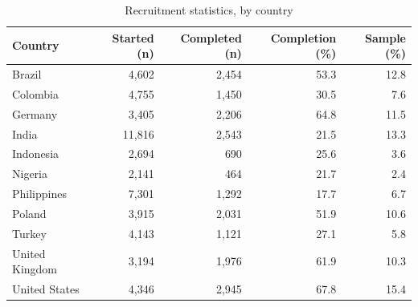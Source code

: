 \begin{table}

\caption{\label{tab:survey-attrition}Recruitment statistics, by country}
\centering
\begin{tabular}[t]{lrrrr}
\toprule
\textbf{Country} & \textbf{Started (n)} & \textbf{Completed (n)} & \textbf{Completion (\%)} & \textbf{Sample (\%)}\\
\midrule
Brazil & 4,602 & 2,454 & 53.3 & 12.8\\
Colombia & 4,755 & 1,450 & 30.5 & 7.6\\
Germany & 3,405 & 2,206 & 64.8 & 11.5\\
India & 11,816 & 2,543 & 21.5 & 13.3\\
Indonesia & 2,694 & 690 & 25.6 & 3.6\\
Nigeria & 2,141 & 464 & 21.7 & 2.4\\
Philippines & 7,301 & 1,292 & 17.7 & 6.7\\
Poland & 3,915 & 2,031 & 51.9 & 10.6\\
Turkey & 4,143 & 1,121 & 27.1 & 5.8\\
United Kingdom & 3,194 & 1,976 & 61.9 & 10.3\\
United States & 4,346 & 2,945 & 67.8 & 15.4\\
\bottomrule
\end{tabular}
\end{table}
